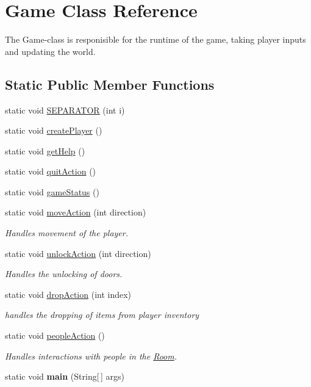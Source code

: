 \hypertarget{classGame}{}\section{Game Class Reference}
\label{classGame}


The Game-\/class is responisible for the runtime of the game, taking player inputs and updating the world.  


\subsection*{Static Public Member Functions}
\begin{DoxyCompactItemize}
\item 
static void \hyperlink{classGame_a612ca57db4b230ac5d927e72519ea571}{S\+E\+P\+A\+R\+A\+T\+O\+R} (int i)
\item 
static void \hyperlink{classGame_a98681c889936305d2ffbc2c368e73c88}{create\+Player} ()
\item 
static void \hyperlink{classGame_abb39f1316ab523fbcda8a5ba115927f6}{get\+Help} ()
\item 
static void \hyperlink{classGame_a53324252827f9f298f67ee4c46675029}{quit\+Action} ()
\item 
static void \hyperlink{classGame_a082940112ca18cad8c195c1da0bf4af3}{game\+Status} ()
\item 
static void \hyperlink{classGame_a730e4053e3dbc100c3bc54bb18d20afd}{move\+Action} (int direction)
\begin{DoxyCompactList}\small\item\em Handles movement of the player. \end{DoxyCompactList}\item 
static void \hyperlink{classGame_abe6ec2322cdfa5005ccccd8b07d789fe}{unlock\+Action} (int direction)
\begin{DoxyCompactList}\small\item\em Handles the unlocking of doors. \end{DoxyCompactList}\item 
static void \hyperlink{classGame_a471f2605a676fc54b9b7b6f2d1b628bf}{drop\+Action} (int index)
\begin{DoxyCompactList}\small\item\em handles the dropping of items from player inventory \end{DoxyCompactList}\item 
\hypertarget{classGame_afd5edfadde47ff28830341b56a7112c1}{}static void \hyperlink{classGame_afd5edfadde47ff28830341b56a7112c1}{people\+Action} ()\label{classGame_afd5edfadde47ff28830341b56a7112c1}

\begin{DoxyCompactList}\small\item\em Handles interactions with people in the \hyperlink{classRoom}{Room}. \end{DoxyCompactList}\item 
\hypertarget{classGame_ae52595a27ac1b327b05db2129ad81fca}{}static void {\bfseries main} (String\mbox{[}$\,$\mbox{]} args)\label{classGame_ae52595a27ac1b327b05db2129ad81fca}

\end{DoxyCompactItemize}


